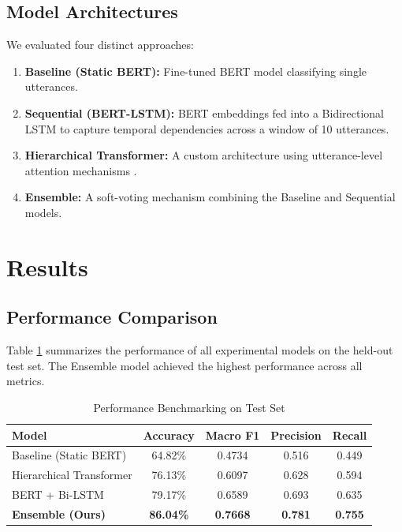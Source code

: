 \documentclass[11pt, a4paper]{article}
\begin{document}
\subsection{Model Architectures}
We evaluated four distinct approaches:
\begin{enumerate}
    \item \textbf{Baseline (Static BERT):} Fine-tuned BERT model classifying single utterances.
    \item \textbf{Sequential (BERT-LSTM):} BERT embeddings fed into a Bidirectional LSTM \cite{hochreiter1997lstm} to capture temporal dependencies across a window of 10 utterances.
    \item \textbf{Hierarchical Transformer:} A custom architecture using utterance-level attention mechanisms \cite{vaswani2017attention}.
    \item \textbf{Ensemble:} A soft-voting mechanism combining the Baseline and Sequential models.
\end{enumerate}

\section{Results}

\subsection{Performance Comparison}
Table \ref{tab:performance} summarizes the performance of all experimental models on the held-out test set. The Ensemble model achieved the highest performance across all metrics.

\begin{table}[h]
    \centering
    \caption{Performance Benchmarking on Test Set}
    \label{tab:performance}
    \begin{tabular}{lcccc}
        \toprule
        \textbf{Model} & \textbf{Accuracy} & \textbf{Macro F1} & \textbf{Precision} & \textbf{Recall} \\
        \midrule
        Baseline (Static BERT) & 64.82\% & 0.4734 & 0.516 & 0.449 \\
        Hierarchical Transformer & 76.13\% & 0.6097 & 0.628 & 0.594 \\
        BERT + Bi-LSTM & 79.17\% & 0.6589 & 0.693 & 0.635 \\
        \textbf{Ensemble (Ours)} & \textbf{86.04\%} & \textbf{0.7668} & \textbf{0.781} & \textbf{0.755} \\
        \bottomrule
    \end{tabular}
\end{table}
\end{document}
